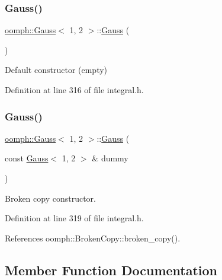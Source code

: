 \subsubsection{\texorpdfstring{Gauss()}{Gauss()}\hspace{0.1cm}{\footnotesize\ttfamily [1/2]}}
{\footnotesize\ttfamily \hyperlink{classoomph_1_1Gauss}{oomph\+::\+Gauss}$<$ 1, 2 $>$\+::\hyperlink{classoomph_1_1Gauss}{Gauss} (\begin{DoxyParamCaption}{ }\end{DoxyParamCaption})\hspace{0.3cm}{\ttfamily [inline]}}



Default constructor (empty) 



Definition at line 316 of file integral.\+h.

\mbox{\label{classoomph_1_1Gauss_3_011_00_012_01_4_a0be4d48ab2c6a6667e922780aafb0960}} 
\subsubsection{\texorpdfstring{Gauss()}{Gauss()}\hspace{0.1cm}{\footnotesize\ttfamily [2/2]}}
{\footnotesize\ttfamily \hyperlink{classoomph_1_1Gauss}{oomph\+::\+Gauss}$<$ 1, 2 $>$\+::\hyperlink{classoomph_1_1Gauss}{Gauss} (\begin{DoxyParamCaption}\item[{const \hyperlink{classoomph_1_1Gauss}{Gauss}$<$ 1, 2 $>$ \&}]{dummy }\end{DoxyParamCaption})\hspace{0.3cm}{\ttfamily [inline]}}



Broken copy constructor. 



Definition at line 319 of file integral.\+h.



References oomph\+::\+Broken\+Copy\+::broken\+\_\+copy().



\subsection{Member Function Documentation}
\mbox{\label{classoomph_1_1Gauss_3_011_00_012_01_4_ae9c2e2d8ea3f4f17805324b0ad0a380d}} 
